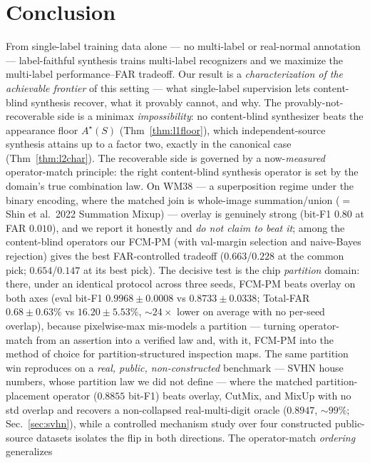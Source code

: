 \documentclass[11pt]{article}
\begin{document}
\section{Conclusion}\label{sec:conclusion}

From single-label training data alone --- no multi-label or real-normal annotation ---
label-faithful synthesis trains multi-label recognizers and we maximize the
multi-label performance--FAR tradeoff. Our result is a \emph{characterization of the
achievable frontier} of this setting --- what single-label supervision lets
content-blind synthesis recover, what it provably cannot, and why. The
provably-not-recoverable side is a minimax \emph{impossibility}: no content-blind
synthesizer beats the appearance floor $A^\star(S)$ (Thm~\ref{thm:l1floor}), which
independent-source synthesis attains up to a factor two, exactly in the canonical case
(Thm~\ref{thm:l2char}). The recoverable side
is governed by a now-\emph{measured} operator-match principle: the right content-blind
synthesis operator is set by the domain's true combination law. On WM38 --- a superposition regime under the binary encoding, where
the matched join is whole-image summation/union ($=$ Shin et al.\ 2022 Summation
Mixup) --- overlay is genuinely strong (bit-F1 $0.80$ at FAR $0.010$), and we report it
honestly and \emph{do not claim to beat it}; among the content-blind operators our
FCM-PM (with val-margin selection and naive-Bayes rejection) gives the best
FAR-controlled tradeoff ($0.663$/$0.228$ at the common pick; $0.654$/$0.147$ at its
best pick). The decisive test is the chip \emph{partition} domain: there, under an
identical protocol across three seeds, FCM-PM beats overlay on both axes (eval bit-F1
$0.9968 \pm 0.0008$ vs $0.8733 \pm 0.0338$; Total-FAR $0.68 \pm 0.63\%$ vs
$16.20 \pm 5.53\%$, ${\sim}24\times$ lower on average with no per-seed overlap), because
pixelwise-max mis-models a partition --- turning operator-match from an assertion into
a verified law and, with it, FCM-PM into the method of choice for partition-structured
inspection maps. The same partition win reproduces on a \emph{real, public, non-constructed}
benchmark --- SVHN house numbers, whose partition law we did not define --- where the matched
partition-placement operator ($0.8855$ bit-F1) beats overlay, CutMix, and MixUp with no std
overlap and recovers a non-collapsed real-multi-digit oracle ($0.8947$, ${\sim}99\%$;
Sec.~\ref{sec:svhn}), while a controlled mechanism study over four constructed public-source
datasets isolates the flip in both directions. The operator-match \emph{ordering} generalizes
\end{document}
